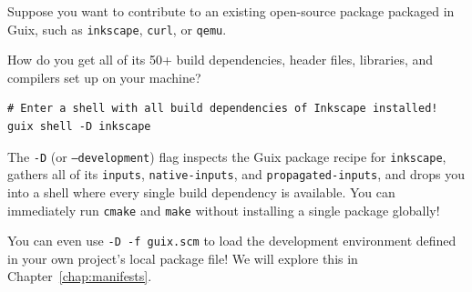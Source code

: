 Suppose you want to contribute to an existing open-source package packaged in Guix, such as \texttt{inkscape}, \texttt{curl}, or \texttt{qemu}. 

How do you get all of its 50+ build dependencies, header files, libraries, and compilers set up on your machine?

\begin{lstlisting}[style=guixcli]
# Enter a shell with all build dependencies of Inkscape installed!
guix shell -D inkscape
\end{lstlisting}

The \texttt{-D} (or \texttt{--development}) flag inspects the Guix package recipe for \texttt{inkscape}, gathers all of its \texttt{inputs}, \texttt{native-inputs}, and \texttt{propagated-inputs}, and drops you into a shell where every single build dependency is available. You can immediately run \texttt{cmake} and \texttt{make} without installing a single package globally!

\begin{protipbox}
You can even use \texttt{-D -f guix.scm} to load the development environment defined in your own project's local package file! We will explore this in Chapter~\ref{chap:manifests}.
\end{protipbox}
